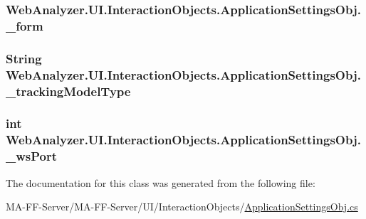\subsubsection[{\+\_\+form}]{ Web\+Analyzer.\+U\+I.\+Interaction\+Objects.\+Application\+Settings\+Obj.\+\_\+form\hspace{0.3cm}{\ttfamily [private]}}\label{class_web_analyzer_1_1_u_i_1_1_interaction_objects_1_1_application_settings_obj_a6b08a377c6dc1e9f0e32d0c786012756}
\hypertarget{class_web_analyzer_1_1_u_i_1_1_interaction_objects_1_1_application_settings_obj_a46f28947ac5d858f82d174097a42f7ac}{}
\subsubsection[{\+\_\+tracking\+Model\+Type}]{\setlength{\rightskip}{0pt plus 5cm}String Web\+Analyzer.\+U\+I.\+Interaction\+Objects.\+Application\+Settings\+Obj.\+\_\+tracking\+Model\+Type\hspace{0.3cm}{\ttfamily [private]}}\label{class_web_analyzer_1_1_u_i_1_1_interaction_objects_1_1_application_settings_obj_a46f28947ac5d858f82d174097a42f7ac}
\hypertarget{class_web_analyzer_1_1_u_i_1_1_interaction_objects_1_1_application_settings_obj_aa8f8de8781d5d9fb22fa8b1d35ccf731}{}
\subsubsection[{\+\_\+ws\+Port}]{\setlength{\rightskip}{0pt plus 5cm}int Web\+Analyzer.\+U\+I.\+Interaction\+Objects.\+Application\+Settings\+Obj.\+\_\+ws\+Port\hspace{0.3cm}{\ttfamily [private]}}\label{class_web_analyzer_1_1_u_i_1_1_interaction_objects_1_1_application_settings_obj_aa8f8de8781d5d9fb22fa8b1d35ccf731}


The documentation for this class was generated from the following file\+:\begin{DoxyCompactItemize}
\item 
M\+A-\/\+F\+F-\/\+Server/\+M\+A-\/\+F\+F-\/\+Server/\+U\+I/\+Interaction\+Objects/\hyperlink{_application_settings_obj_8cs}{Application\+Settings\+Obj.\+cs}\end{DoxyCompactItemize}
